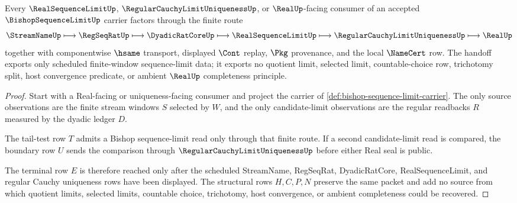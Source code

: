 \begin{theorem}
\label{thm:bishop-sequence-limit-real-seal-handoff}
Every $\RealSequenceLimitUp$, $\RegularCauchyLimitUniquenessUp$, or $\RealUp$-facing consumer of an accepted $\BishopSequenceLimitUp$ carrier factors through the finite route
$$
\StreamNameUp \longmapsto \RegSeqRatUp \longmapsto \DyadicRatCoreUp \longmapsto \RealSequenceLimitUp \longmapsto \RegularCauchyLimitUniquenessUp \longmapsto \RealUp
$$
together with componentwise $\hsame$ transport, displayed $\Cont$ replay, $\Pkg$ provenance, and the local $\NameCert$ row. The handoff exports only scheduled finite-window sequence-limit data; it exports no quotient limit, selected limit, countable-choice row, trichotomy split, host convergence predicate, or ambient $\RealUp$ completeness principle.
\end{theorem}
\begin{proof}
Start with a Real-facing or uniqueness-facing consumer and project the carrier of \autoref{def:bishop-sequence-limit-carrier}. The only source observations are the finite stream windows $S$ selected by $W$, and the only candidate-limit observations are the regular readbacks $R$ measured by the dyadic ledger $D$.

The tail-test row $T$ admits a Bishop sequence-limit read only through that finite route. If a second candidate-limit read is compared, the boundary row $U$ sends the comparison through $\RegularCauchyLimitUniquenessUp$ before either Real seal is public.

The terminal row $E$ is therefore reached only after the scheduled StreamName, RegSeqRat, DyadicRatCore, RealSequenceLimit, and regular Cauchy uniqueness rows have been displayed. The structural rows $H,C,P,N$ preserve the same packet and add no source from which quotient limits, selected limits, countable choice, trichotomy, host convergence, or ambient completeness could be recovered.
\end{proof}



